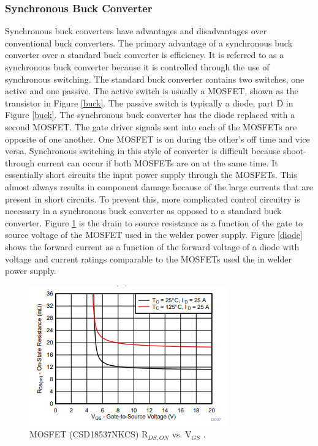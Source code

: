 \documentclass[11pt]{article}
\begin{document}
    \subsubsection{Synchronous Buck Converter}
    
    \noindent  Synchronous buck converters have advantages and disadvantages over conventional buck converters. The primary advantage of a synchronous buck converter over a standard buck converter is efficiency. It is referred to as a synchronous buck converter because it is controlled through the use of synchronous switching. The standard buck converter contains two switches, one active and one passive. The active switch is usually a MOSFET, shown as the transistor in Figure \ref{buck}. The passive switch is typically a diode, part D in Figure \ref{buck}. The  synchronous buck converter has the diode replaced with a second MOSFET.  The gate driver signals sent into each of the MOSFETs are opposite of one another. One MOSFET is on during the other's off time and vice versa. Synchronous switching in this style of converter is difficult because shoot-through current can occur if both MOSFETs are on at the same time. It essentially short circuits the input power supply through the MOSFETs. This almost always results in component damage because of the large currents that are present in short circuits. To prevent this, more complicated control circuitry is necessary in a synchronous buck converter as opposed to a standard buck converter. Figure \ref{mosfet} is the drain to source resistance as a function of the gate to source voltage of the MOSFET used in the welder power supply. Figure \ref{diode} shows the forward current as a function of the forward voltage of a diode with voltage and current ratings comparable to the MOSFETs used the in welder power supply.
    
    \begin{figure}[H]
            \centering
            \includegraphics[width=0.5\linewidth]{mosfet.PNG}
            \caption{MOSFET (CSD18537NKCS) R$_{DS,ON}$ vs. V$_{GS}$ \cite{texas_instruments_csd18537nkcs_2013}.}
            \label{mosfet}
        \end{figure}
    
\end{document}
